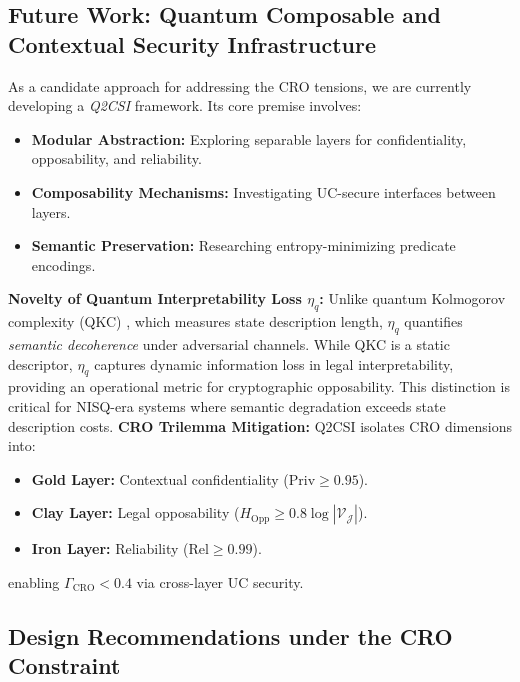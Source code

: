 \documentclass[preprint,12pt]{elsarticle}
\begin{document}
        \subsection{Future Work: Quantum Composable and Contextual Security Infrastructure}\label{subsec:qcsi}
            As a candidate approach for addressing the CRO tensions, we are currently developing a \textit{Q2CSI} framework. Its core premise involves:
            \begin{itemize}
                \item \textbf{Modular Abstraction:} Exploring separable layers for confidentiality, opposability, and reliability.
                \item \textbf{Composability Mechanisms:} Investigating UC-secure interfaces between layers.
                \item \textbf{Semantic Preservation:} Researching entropy-minimizing predicate encodings.
            \end{itemize}
            \textbf{Novelty of Quantum Interpretability Loss $\eta_q$:} Unlike quantum Kolmogorov complexity (QKC) \cite{Berthiaume1997}, which measures state description length, $\eta_q$ quantifies \textit{semantic decoherence} under adversarial channels. While QKC is a static descriptor, $\eta_q$ captures dynamic information loss in legal interpretability, providing an operational metric for cryptographic opposability. This distinction is critical for NISQ-era systems where semantic degradation exceeds state description costs.
            \textbf{CRO Trilemma Mitigation:} Q2CSI isolates CRO dimensions into:
            \begin{itemize}
                \item \textbf{Gold Layer:} Contextual confidentiality ($\mathrm{Priv} \geq 0.95$).
                \item \textbf{Clay Layer:} Legal opposability ($H_{\text{Opp}} \geq 0.8\log|\mathcal{V_J}|$).
                \item \textbf{Iron Layer:} Reliability ($\mathrm{Rel} \geq 0.99$).
            \end{itemize}
            enabling $\Gamma_{\text{CRO}} < 0.4$ via cross-layer UC security.

        \subsection{Design Recommendations under the CRO Constraint}\label{subsec:cro_recommendations}
\end{document}
